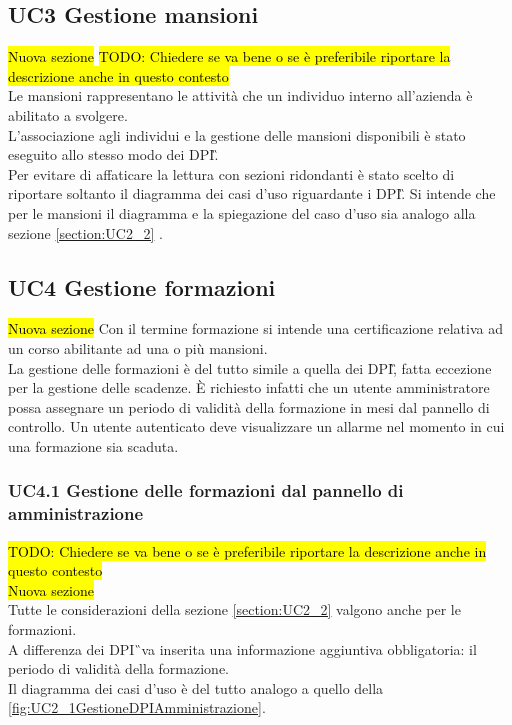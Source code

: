	\subsection{UC3 Gestione  mansioni}
		\label{section:UC3}
		\hl{Nuova sezione}
		\hl{TODO: Chiedere se va bene o se è preferibile riportare la descrizione anche in questo contesto}\\
		Le mansioni rappresentano le attività che un individuo interno all'azienda è abilitato a svolgere.\\
		L'associazione agli individui e la gestione delle mansioni disponibili è stato eseguito allo stesso modo dei \gls{DPI}\G. \\
		Per evitare di affaticare la lettura con sezioni ridondanti è stato scelto di riportare soltanto il diagramma dei casi d'uso riguardante i \gls{DPI}\G. Si intende che per le mansioni il diagramma e la spiegazione del caso d'uso sia analogo alla sezione \ref{section:UC2_2} . 
	\subsection{UC4 Gestione formazioni}
		\label{section:UC4}
		\hl{Nuova sezione}
		Con il termine formazione si intende una certificazione relativa ad un corso abilitante ad una o più mansioni.\\
		La gestione delle formazioni è del tutto simile a quella dei \gls{DPI}\G, fatta eccezione per la gestione delle scadenze. È richiesto infatti che un utente amministratore possa assegnare un periodo di validità della formazione in mesi dal pannello di controllo. Un utente autenticato deve visualizzare un allarme nel momento in cui una formazione sia scaduta.
	\subsubsection{UC4.1 Gestione delle formazioni dal pannello di amministrazione }
		\hl{TODO: Chiedere se va bene o se è preferibile riportare la descrizione anche in questo contesto}\\
		\hl{Nuova sezione}\\
		Tutte le considerazioni della sezione \ref{section:UC2_2} valgono anche per le formazioni. \\
		A differenza dei \gls{DPI}\G\ va inserita una informazione aggiuntiva obbligatoria: il periodo di validità della formazione. \\
		Il diagramma dei casi d'uso è del tutto analogo a quello della  \autoref{fig:UC2_1GestioneDPIAmministrazione}.
